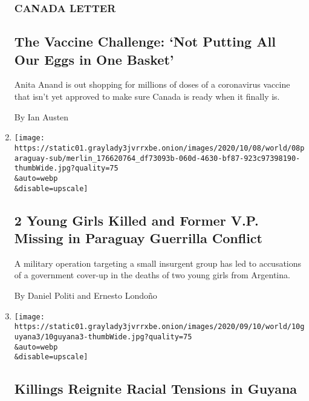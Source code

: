 \begin{enumerate}
  \hypertarget{canada-letter}{%
  \subsubsection{CANADA LETTER}\label{canada-letter}}

  \hypertarget{the-vaccine-challenge-not-putting-all-our-eggs-in-one-basket}{%
  \subsection{The Vaccine Challenge: `Not Putting All Our Eggs in One
  Basket'}\label{the-vaccine-challenge-not-putting-all-our-eggs-in-one-basket}}

  Anita Anand is out shopping for millions of doses of a coronavirus
  vaccine that isn't yet approved to make sure Canada is ready when it
  finally is.

  By Ian Austen
\item
  \href{/2020/09/11/world/americas/paraguay-military-girls.html}{}

  \texttt{[image: https://static01.graylady3jvrrxbe.onion/images/2020/10/08/world/08paraguay-sub/merlin\_176620764\_df73093b-060d-4630-bf87-923c97398190-thumbWide.jpg?quality=75\\\&auto=webp\\\&disable=upscale]}

  \hypertarget{2-young-girls-killed-and-former-vp-missing-in-paraguay-guerrilla-conflict}{%
  \subsection{2 Young Girls Killed and Former V.P. Missing in Paraguay
  Guerrilla
  Conflict}\label{2-young-girls-killed-and-former-vp-missing-in-paraguay-guerrilla-conflict}}

  A military operation targeting a small insurgent group has led to
  accusations of a government cover-up in the deaths of two young girls
  from Argentina.

  By Daniel Politi and Ernesto Londoño
\item
  \href{/2020/09/10/world/americas/killings-guyana-racial-tension.html}{}

  \texttt{[image: https://static01.graylady3jvrrxbe.onion/images/2020/09/10/world/10guyana3/10guyana3-thumbWide.jpg?quality=75\\\&auto=webp\\\&disable=upscale]}

  \hypertarget{killings-reignite-racial-tensions-in-guyana}{%
  \subsection{Killings Reignite Racial Tensions in
  Guyana}\label{killings-reignite-racial-tensions-in-guyana}}


\end{enumerate}
